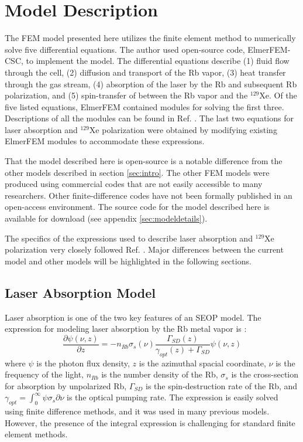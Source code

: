 \section{\label{sec:model}Model Description}
The FEM model presented here utilizes the finite element method to numerically solve five differential equations. The author used open-source code, ElmerFEM-CSC, to implement the model. The differential equations describe (1) fluid flow through the cell, (2) diffusion and transport of the Rb vapor, (3) heat transfer through the gas stream, (4) absorption of the laser by the Rb and subsequent Rb polarization, and (5) spin-transfer of between the Rb vapor and the $^{129}$Xe. Of the five listed equations, ElmerFEM contained modules for solving the first three. Descriptions of all the modules can be found in Ref. \cite{Raback2015}. The last two equations for laser absorption and $^{129}$Xe polarization were obtained by modifying existing ElmerFEM modules to accommodate these expressions. 

That the model described here is open-source is a notable difference from the other models described in section \ref{sec:intro}. The other FEM models were produced using commercial codes that are not easily accessible to many researchers. Other finite-difference codes have not been formally published in an open-access environment. The source code for the model described here is available for download (see appendix \ref{sec:modeldetails}).

The specifics of the expressions used to describe laser absorption and $^{129}$Xe polarization very closely followed Ref. \cite{Fink2005}. Major differences between the current model and other models will be highlighted in the following sections.

\subsection{\label{sec:laserasborb}Laser Absorption Model}
Laser absorption is one of the two key features of an SEOP model. The expression for modeling laser absorption by the Rb metal vapor is \cite{Wagshul1989OpticalPolarization}:
\begin{equation}
    \frac{\partial \psi(\nu,z)}{\partial z} = -n_{Rb}\sigma_s(\nu)\frac{\Gamma_{SD}(z)}{\gamma_{opt}(z) + \Gamma_{SD}}\psi(\nu,z)
\end{equation}
where $\psi$ is the photon flux density, $z$ is the azimuthal spacial coordinate, $\nu$ is the frequency of the light, $n_{Rb}$ is the number density of the Rb, $\sigma_s$ is the cross-section for absorption by unpolarized Rb, $\Gamma_{SD}$ is the spin-destruction rate of the Rb, and $\gamma_{opt} = \int_0^{\infty} \psi \sigma_s \partial \nu$ is the optical pumping rate. The expression is easily solved using finite difference methods, and it was used in many previous models. However, the presence of the integral expression is challenging for standard finite element methods.

